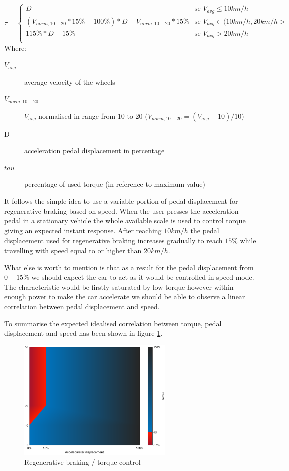 \begin{equation*}
    \tau = \begin{cases}
        D & \text{se $V_{avg} \leq 10km/h$}\\
        (V_{norm,10-20} * 15\% + 100\%) * D - V_{norm,10-20} * 15\% & \text{se $V_{avg} \in (10km/h,20km/h>$}\\
        115\% * D - 15\% & \text{se $V_{avg} > 20km/h$}\\
    \end{cases}
    \label{reg_break_eq}
\end{equation*}
Where:
\begin{description}
    \item[$V_{avg}$] average velocity of the wheels 
    \item[$V_{norm,10-20}$] $V_{avg}$ normalised in range from 10 to 20 ($V_{norm,10-20}=(V_{avg}-10)/10$)
    \item[D] acceleration pedal displacement in percentage
    \item[$tau$] percentage of used torque (in reference to maximum value)
\end{description}

It follows the simple idea to use a variable portion of pedal displacement for regenerative braking based on speed.
When the user presses the acceleration pedal in a stationary vehicle the whole available scale is used to control torque giving an expected instant response. After reaching $10km/h$ the pedal displacement used for regenerative braking increases gradually to reach $15\%$ while travelling with speed equal to or higher than $20km/h$.

What else is worth to mention is that as a result for the pedal displacement from $0-15\%$ we should expect the car to act as it would be controlled in speed mode.\label{speed_mode} The characteristic would be firstly saturated by low torque however within enough power to make the car accelerate we should be able to observe a linear correlation between pedal displacement and speed.

To summarise the expected idealised correlation between torque, pedal displacement and speed has been shown in figure \ref{fig:regen_ideal}.

\begin{figure}[H]
    \centering
        \includegraphics[height=5.8cm]{figures/regen_ideal}
        \caption{Regenerative braking / torque control}
        \label{fig:regen_ideal}
\end{figure}




